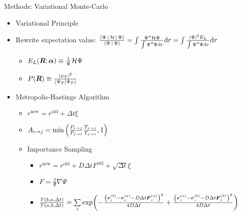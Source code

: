 \documentclass[10pt, t, xcolor=dvipsnames]{beamer}
\begin{document}
\begin{frame}[fragile]{Methods: Variational Monte-Carlo}
    \begin{itemize}
        \item Variational Principle
        \item Rewrite expectation value:
            $\frac{\Braket{\Psi|\mathcal{H}|\Psi}}{\Braket{\Psi|\Psi}} = \int
            \frac{\cnj{\Psi}\mathcal{H}\Psi}{\int \cnj{\Psi}\Psi \md r} \md r
            = \int \frac{\abs{\Psi}^2E_L}{\int \cnj{\Psi}\Psi \md r} \md r$
            \begin{itemize}
                \item $E_L(\bm{{R}};\bm{{\alpha}}) \equiv \frac{1}{\Psi}\mathcal{H}\Psi$
                \item $P(\bm{{R}}) \equiv \frac{\abs{\psi_T}^2}{\bra{\Psi_T}\ket{\Psi_T}}$
            \end{itemize}
        \item Metropolis-Hastings Algorithm
            \begin{itemize}
                \item $r^{\text{new}} = r^{\text{old}} + \Delta t \xi$
                \item $A_{i\rightarrow j} =
                    \text{min}\left(\frac{P_{i\rightarrow j}}{P_{j\rightarrow i}}
                    \frac{T_{i\rightarrow j}}{T_{j\rightarrow i}} ,1\right)$
                \item Importance Sampling
                    \begin{itemize}
                        \item $r^{\text{new}} = r^{\text{old}} + D \Delta t
                            F^{\text{old}} + \sqrt{\Delta t}\xi$
                        \item $F = \frac{2}{\Psi}\nabla \Psi$ 
                        \item $\frac{T(b,a,\Delta t)}{T(a,b,\Delta t)} =
                            \sum\limits_i \exp(-\frac{\left(\bm{{r}}^{(b)}_i -
                            \bm{{r}}^{(a)}_i - D\Delta t
                            \bm{{F}}^{(a)}_i\right)^2}{4D\Delta t}
                            +\frac{\left(\bm{{r}}^{(a)}_i - \bm{{r}}^{(b)}_i -
                            D\Delta t \bm{{F}}^{(b)}_i\right)^2}{4D\Delta t})$
                    \end{itemize}
            \end{itemize}
    \end{itemize}
\end{frame}
\end{document}
